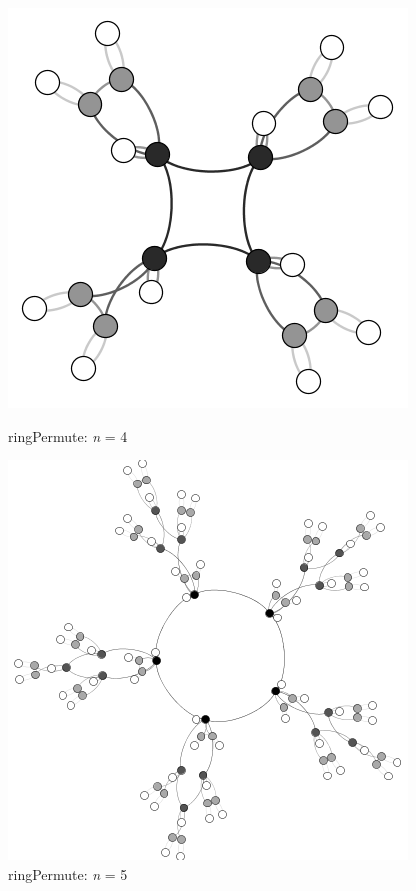 \documentclass[12pt]{article}
\begin{document}
\newpage
\begin{figure}[ht]
\begin{minipage}[b]{0.5\linewidth}
\centering
\includegraphics[scale=0.55]{Graphs/4-permute400.png}
\caption{ringPermute: \emph{n} = 4}
\label{ringPermute-4}
\end{minipage}
\hspace{0.5cm}
\begin{minipage}[b]{0.5\linewidth}
\centering
\includegraphics[scale=0.55]{Graphs/5-permute400.png}
\caption{ringPermute: \emph{n} = 5}
\label{ringPermute-5}
\end{minipage}
\end{figure}
\pagebreak[2]
\end{document}
